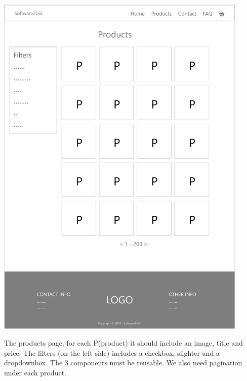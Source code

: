 \documentclass[11pt]{report}
\begin{document}
\begin{center}
\includegraphics[height=17cm]{page2}
\end{center}
\noindent The products page, for each P(product) it should include an image, title and price. The filters (on the left side) includes a checkbox, slighter and a dropdownbox. The 3 components must be reusable. We also need pagination under each product.
\end{document}
